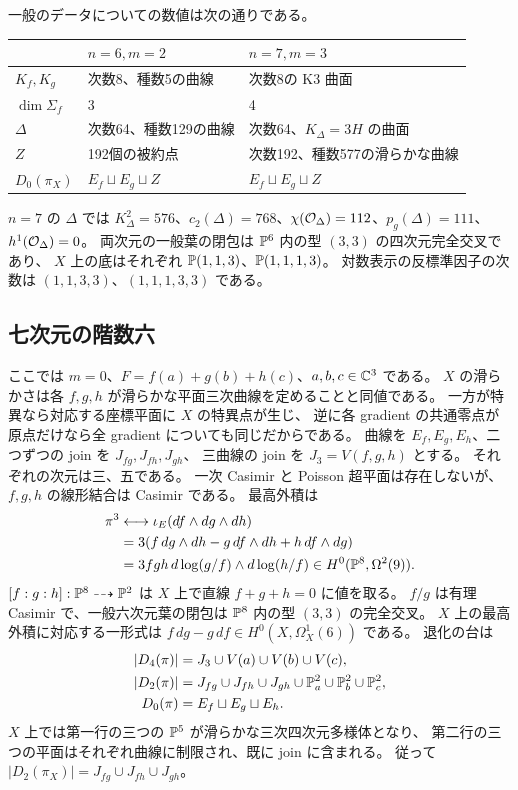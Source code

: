 一般のデータについての数値は次の通りである。
\begin{center}
\begin{tabular}{lll}\toprule
 & $n=6,m=2$ & $n=7,m=3$\\\midrule
$K_f,K_g$ & 次数8、種数5の曲線 & 次数8の K3 曲面\\
$\dim\Sigma_f$ & 3 & 4\\
$\Delta$ & 次数64、種数129の曲線 & 次数64、$K_\Delta=3H$ の曲面\\
$Z$ & 192個の被約点 & 次数192、種数577の滑らかな曲線\\
$D_0(\pi_X)$ & $E_f\sqcup E_g\sqcup Z$ & $E_f\sqcup E_g\sqcup Z$\\\bottomrule
\end{tabular}
\end{center}
$n=7$ の $\Delta$ では
$K_\Delta^2=576$、$c_2(\Delta)=768$、$\chi(\mathcal O_\Delta)=112$、$p_g(\Delta)=111$、$h^1(\mathcal O_\Delta)=0$。
両次元の一般葉の閉包は $\mathbb P^6$ 内の型 $(3,3)$ の四次元完全交叉であり、
$X$ 上の底はそれぞれ $\mathbb P(1,1,3)$、$\mathbb P(1,1,1,3)$。
対数表示の反標準因子の次数は $(1,1,3,3)$、$(1,1,1,3,3)$ である。

\subsection{七次元の階数六}
ここでは $m=0$、$F=f(a)+g(b)+h(c)$、$a,b,c\in\mathbb C^3$ である。
$X$ の滑らかさは各 $f,g,h$ が滑らかな平面三次曲線を定めることと同値である。
一方が特異なら対応する座標平面に $X$ の特異点が生じ、
逆に各 gradient の共通零点が原点だけなら全 gradient についても同じだからである。
曲線を $E_f,E_g,E_h$、二つずつの join を $J_{fg},J_{fh},J_{gh}$、
三曲線の join を $J_3=V(f,g,h)$ とする。
それぞれの次元は三、五である。
一次 Casimir と Poisson 超平面は存在しないが、$f,g,h$ の線形結合は Casimir である。
最高外積は
\begin{align*}
\pi^3&\longleftrightarrow\iota_E(df\wedge dg\wedge dh)\\
&=3(f\,dg\wedge dh-g\,df\wedge dh+h\,df\wedge dg)\\
&=3fgh\,d\log(g/f)\wedge d\log(h/f)\in H^0(\mathbb P^8,\Omega^2(9)).
\end{align*}
$[f:g:h]:\mathbb P^8\dashrightarrow\mathbb P^2$ は $X$ 上で直線 $f+g+h=0$ に値を取る。
$f/g$ は有理 Casimir で、一般六次元葉の閉包は $\mathbb P^8$ 内の型 $(3,3)$ の完全交叉。
$X$ 上の最高外積に対応する一形式は
$f\,dg-g\,df\in H^0(X,\Omega_X^1(6))$ である。
退化の台は
\begin{align*}
|D_4(\pi)|&=J_3\cup V(a)\cup V(b)\cup V(c),\\
|D_2(\pi)|&=J_{fg}\cup J_{fh}\cup J_{gh}\cup\mathbb P_a^2\cup\mathbb P_b^2\cup\mathbb P_c^2,\\
D_0(\pi)&=E_f\sqcup E_g\sqcup E_h.
\end{align*}
$X$ 上では第一行の三つの $\mathbb P^5$ が滑らかな三次四次元多様体となり、
第二行の三つの平面はそれぞれ曲線に制限され、既に join に含まれる。
従って $|D_2(\pi_X)|=J_{fg}\cup J_{fh}\cup J_{gh}$。


